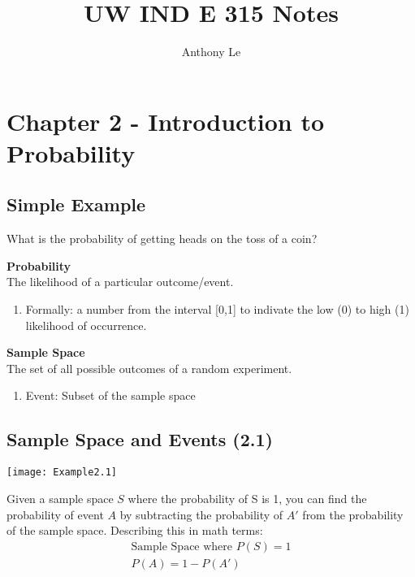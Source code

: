 \documentclass[../INDE315.tex]{subfiles}
\title{UW IND E 315 Notes}
\author{Anthony Le}
\begin{document}
\pagestyle{fancy}
\fancyhead{}


\section*{Chapter 2 - Introduction to Probability}
\subsection*{Simple Example}
\begin{exmp}
    What is the probability of getting heads on the toss of a coin?
\end{exmp}
\begin{defn}
    \textbf{Probability} \\
    The likelihood of a particular outcome/event.
    \begin{enumerate}
        \item Formally: a number from the interval [0,1] to indivate the low (0) to high (1) likelihood of occurrence.
    \end{enumerate}
\end{defn}

\begin{defn}
    \textbf{Sample Space} \\
    The set of all possible outcomes of a random experiment.
    \begin{enumerate}
        \item Event: Subset of the sample space
    \end{enumerate}
\end{defn}

\subsection*{Sample Space and Events (2.1)}
    \begin{center}
        \texttt{[image: Example2.1]}
    \end{center}
Given a sample space $S$ where the probability of S is 1, you can find the probability of event $A$ by subtracting the probability of $A'$ from the probability of the sample space. Describing this in math terms:
\begin{equation*}
    \begin{aligned}
        \text{Sample Space where } P(S) = 1 \\
        P(A) = 1- P(A')
    \end{aligned}
\end{equation*}
\end{document}
